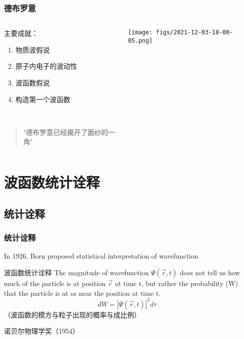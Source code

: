 \begin{frame}
    \frametitle{德布罗意}
        \begin{columns}
            \begin{column}[t]{0.46\linewidth}
                主要成就：\\
                \begin{enumerate}
                     \item 物质波假说
                     \item 原子内电子的波动性
                     \item 波函数假说 
                     \item 构造第一个波函数
                \end{enumerate}
                ~\\
                \begin{quote}
                "德布罗意已经揭开了面纱的一角"  \\
                \end{quote}  
            \end{column}
            \begin{column}[t]{0.46\linewidth}
                \begin{center}
                    \texttt{[image: figs/2021-12-03-18-00-05.png]} \\
                \end{center} 
            \end{column}
        \end{columns}
\end{frame}

\section{波函数统计诠释}

\subsection{统计诠释}
\begin{frame}
    \frametitle{统计诠释}
    In 1926, Born proposed statistical interpretation of wavefunction
    \begin{atcbox}{波函数统计诠释}
        The magnitude of wavefunction $\Psi(\vec{r},t)$ does not tell us how much of 
        the particle is at position $\vec{r}$ at time t, 
        but rather the probability (W) that the particle is at or near the position at time t. 
        \[ d W = |\Psi(\vec{r},t)|^2 d \tau \]
    （波函数的模方与粒子出现的概率与成比例）
    \end{atcbox}
    {\color{deepred} 诺贝尔物理学奖（1954）}
\end{frame}


